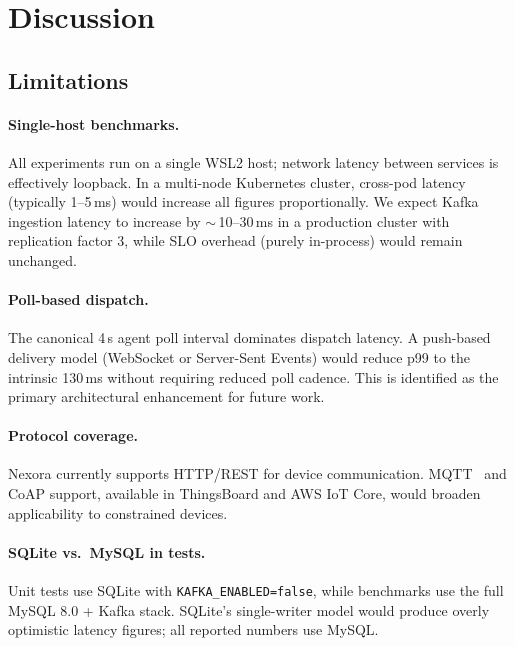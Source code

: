 \documentclass[twocolumn,smallextended]{svjour3}
\begin{document}
\section{Discussion}
\label{sec:discussion}

\subsection{Limitations}

\paragraph{Single-host benchmarks.}
All experiments run on a single WSL2 host; network latency between services
is effectively loopback. In a multi-node Kubernetes cluster, cross-pod latency
(typically 1--5\,ms) would increase all figures proportionally.
We expect Kafka ingestion latency to increase by $\sim$\,10--30\,ms
in a production cluster with replication factor 3, while SLO overhead
(purely in-process) would remain unchanged.

\paragraph{Poll-based dispatch.}
The canonical 4\,s agent poll interval dominates dispatch latency.
A push-based delivery model (WebSocket or Server-Sent Events) would reduce
p99 to the intrinsic 130\,ms without requiring reduced poll cadence.
This is identified as the primary architectural enhancement for future work.

\paragraph{Protocol coverage.}
Nexora currently supports HTTP/REST for device communication.
MQTT~\cite{gubbi2013iot} and CoAP support, available in ThingsBoard and
AWS IoT Core, would broaden applicability to constrained devices.

\paragraph{SQLite vs.\ MySQL in tests.}
Unit tests use SQLite with \texttt{KAFKA\_ENABLED=false}, while benchmarks
use the full MySQL 8.0 + Kafka stack. SQLite's single-writer model would
produce overly optimistic latency figures; all reported numbers use MySQL.
\end{document}

